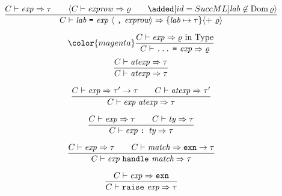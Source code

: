 \begin{equation}        %
\frac{\C\ts\exp\ra\tau\qquad\langle\C\ts\labexps\ra\varrho\qquad\ADD{\lab\not\in\Dom\varrho}\rangle}
     {\C\ts\longlabexps\ra\{\lab\mapsto\tau\}\langle +\ \varrho\rangle}\index{27.2}
\end{equation}%

\BeginNewEqns%
\begin{equation} %
\color{\addcolor}
\frac{\C\ts\exp\ra\varrho\ \In\ \Type}
     {\C\ts\boxml{...}\ \boxml{=}\ \exp\ra\varrho}
\end{equation}%
\EndNewEqns%
%
\begin{equation}        %
\label{atexp-rule}
\frac{\C\ts\atexp\ra\tau}
     {\C\ts\atexp\ra\tau}\index{27.3}
\end{equation}

\begin{equation}        %
\frac{\C\ts\exp\ra\tau'\rightarrow\tau\qquad\C\ts\atexp\ra\tau'}
     {\C\ts\appexp\ra\tau}
\end{equation}

\begin{equation}        %
\label{typedexp-rule}
\frac{\C\ts\exp\ra\tau\qquad\C\ts\ty\ra\tau}
     {\C\ts\typedexp\ra\tau}
\end{equation}

\begin{equation}        %
\frac{\C\ts\exp\ra\tau\qquad\C\ts\match\ra\EXCN\rightarrow\tau}
     {\C\ts\handlexp\ra\tau}
\end{equation}

\begin{equation}        %
\label{raiseexp-rule}
\frac{\C\ts\exp\ra\EXCN}
     {\C\ts\raisexp\ra\tau}
\end{equation}

